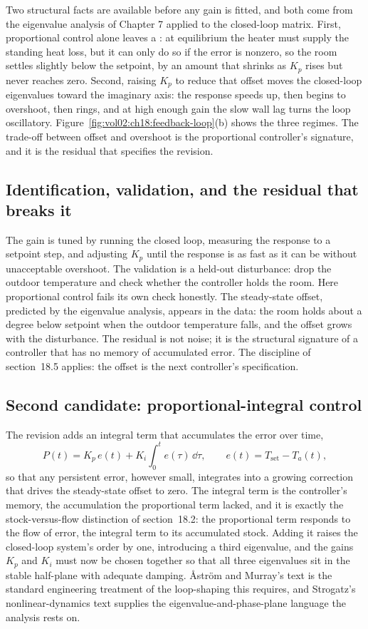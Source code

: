 Two structural facts are available before any gain is fitted, and both come
from the eigenvalue analysis of Chapter 7 applied to the closed-loop
matrix. First, proportional control alone leaves a : at equilibrium the heater must supply the standing heat loss, but
it can only do so if the error is nonzero, so the room settles slightly
below the setpoint, by an amount that shrinks as $K_p$ rises but never
reaches zero. Second, raising $K_p$ to reduce that offset moves the
closed-loop eigenvalues toward the imaginary axis: the response speeds up,
then begins to overshoot, then rings, and at high enough gain the slow wall
lag turns the loop oscillatory. Figure~\ref{fig:vol02:ch18:feedback-loop}(b)
shows the three regimes. The trade-off between offset and overshoot is the
proportional controller's signature, and it is the residual that specifies
the revision.

\subsection{Identification, validation, and the residual that breaks it}

The gain is tuned by running the closed loop, measuring the response to a
setpoint step, and adjusting $K_p$ until the response is as fast as it can
be without unacceptable overshoot. The validation is a held-out
disturbance: drop the outdoor temperature and check whether the controller
holds the room. Here proportional control fails its own check honestly. The
steady-state offset, predicted by the eigenvalue analysis, appears in the
data: the room holds about a degree below setpoint when the outdoor
temperature falls, and the offset grows with the disturbance. The residual
is not noise; it is the structural signature of a controller that has no
memory of accumulated error. The discipline of section~18.5 applies: the
offset is the next controller's specification.

\subsection{Second candidate: proportional-integral control}

The revision adds an integral term that accumulates the error over time,
\[
P(t) = K_p\,e(t) + K_i \int_0^t e(\tau)\,\dd\tau,
\qquad e(t) = T_{\text{set}} - T_a(t),
\]
so that any persistent error, however small, integrates into a growing
correction that drives the steady-state offset to zero. The integral term
is the controller's memory, the accumulation the proportional term lacked,
and it is exactly the stock-versus-flow distinction of section~18.2: the
proportional term responds to the flow of error, the integral term to its
accumulated stock. Adding it raises the closed-loop system's order by one,
introducing a third eigenvalue, and the gains $K_p$ and $K_i$ must now be
chosen together so that all three eigenvalues sit in the stable half-plane
with adequate damping. {\AA}str{\"o}m and Murray's text
\cite{text:astrom-murray2021} is the standard engineering treatment of the
loop-shaping this requires, and Strogatz's nonlinear-dynamics text
\cite{text:v2ch07-strogatz-nonlinear} supplies the eigenvalue-and-phase-plane
language the analysis rests on.

